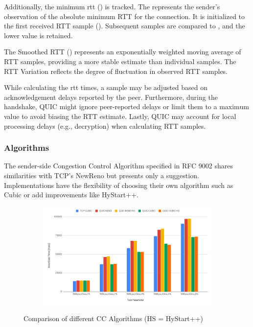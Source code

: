 Additionally, the minimum rtt () is tracked. The  represents the sender's observation of the absolute
minimum RTT for the connection. It is initialized to the first received RTT sample (). Subsequent samples are compared
to , and the lower value is retained.

The Smoothed RTT () represents an exponentially weighted moving average of RTT samples, providing a more stable
estimate than individual samples. The RTT Variation  reflects the degree of fluctuation in observed RTT samples.

While calculating the rtt times, a sample may be adjusted based on acknowledgement delays reported by the peer. Furthermore, during the
handshake, QUIC might ignore peer-reported delays or limit them to a maximum value to avoid
biasing the RTT estimate. Lastly, QUIC may account for local processing delays (e.g., decryption) when calculating RTT samples.

\subsubsection{Algorithms}

The sender-side Congestion Control Algorithm specified in RFC 9002\cite[17]{rfc9002} shares similarities with TCP's
NewReno\cite[]{rfc6582} but presents only a suggestion. Implementations have the flexibility of choosing their own algorithm such as
Cubic\cite[]{rfc8312} or add improvements like HyStart++\cite[]{rfc9406}.

\begin{figure}[h]
    \centering
    \begin{subfigure}[b]{1.0\textwidth}
      \includegraphics[width=1.0\linewidth]{img/cc}
    \end{subfigure}
    \caption{Comparison of different CC Algorithms (HS = HyStart++) \cite[]{ccgraphic}}
    \label{cc_comparison}
\end{figure}

